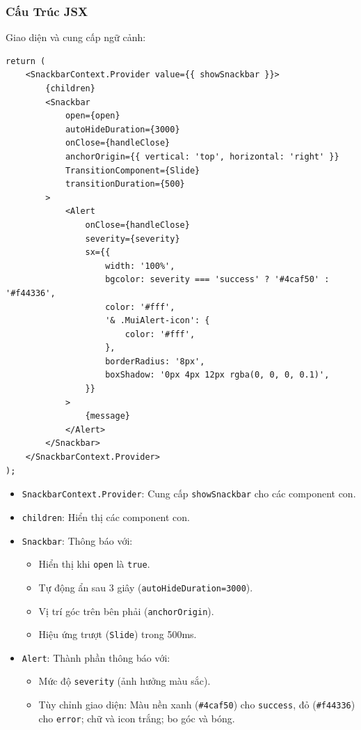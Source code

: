             \subsubsection{Cấu Trúc JSX}
                \hspace*{0.6cm}Giao diện và cung cấp ngữ cảnh:
                \begin{lstlisting}
return (
    <SnackbarContext.Provider value={{ showSnackbar }}>
        {children}
        <Snackbar
            open={open}
            autoHideDuration={3000}
            onClose={handleClose}
            anchorOrigin={{ vertical: 'top', horizontal: 'right' }}
            TransitionComponent={Slide}
            transitionDuration={500}
        >
            <Alert
                onClose={handleClose}
                severity={severity}
                sx={{
                    width: '100%',
                    bgcolor: severity === 'success' ? '#4caf50' : '#f44336',
                    color: '#fff',
                    '& .MuiAlert-icon': {
                        color: '#fff',
                    },
                    borderRadius: '8px',
                    boxShadow: '0px 4px 12px rgba(0, 0, 0, 0.1)',
                }}
            >
                {message}
            </Alert>
        </Snackbar>
    </SnackbarContext.Provider>
);
                \end{lstlisting}
                \begin{itemize}
                    \item \texttt{SnackbarContext.Provider}: Cung cấp \texttt{showSnackbar} cho các component con.
                    \item \texttt{children}: Hiển thị các component con.
                    \item \texttt{Snackbar}: Thông báo với:
                    \begin{itemize}
                        \item Hiển thị khi \texttt{open} là \texttt{true}.
                        \item Tự động ẩn sau 3 giây (\texttt{autoHideDuration={3000}}).
                        \item Vị trí góc trên bên phải (\texttt{anchorOrigin}).
                        \item Hiệu ứng trượt (\texttt{Slide}) trong 500ms.
                    \end{itemize}
                    \item \texttt{Alert}: Thành phần thông báo với:
                    \begin{itemize}
                        \item Mức độ \texttt{severity} (ảnh hưởng màu sắc).
                        \item Tùy chỉnh giao diện: Màu nền xanh (\texttt{\#4caf50}) cho \texttt{success}, đỏ (\texttt{\#f44336}) cho \texttt{error}; chữ và icon trắng; bo góc và bóng.
                    \end{itemize}
                \end{itemize}

